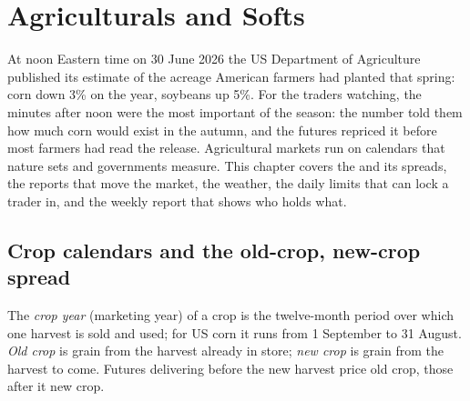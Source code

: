 \chapter{Agriculturals and Softs}\label{ch:m3:agriculturals-and-softs}

At noon Eastern time on 30 June 2026 the US Department of Agriculture published its estimate of
the acreage American farmers had planted that spring: corn down 3\% on the year, soybeans up 5\%.
For the traders watching, the minutes after noon were the most important of the season: the
number told them how much corn would exist in the autumn, and the futures repriced it before most
farmers had read the release. Agricultural markets run on calendars that nature sets and
governments measure. This chapter covers the  and its spreads, the reports that move the
market, the weather, the daily limits that can lock a trader in, and the weekly report that shows
who holds what.

\section{Crop calendars and the old-crop, new-crop spread}

\begin{definition}\label{def:m3:agriculturals-and-softs:cropyear}
The \emph{crop year} (marketing year) of a crop is the twelve-month period over
which one harvest is sold and used; for US corn it runs from 1 September to 31 August.
\emph{Old crop} is grain from the harvest already in store; \emph{new
crop} is grain from the harvest to come. Futures delivering before the new harvest
price old crop, those after it new crop.
\end{definition}

